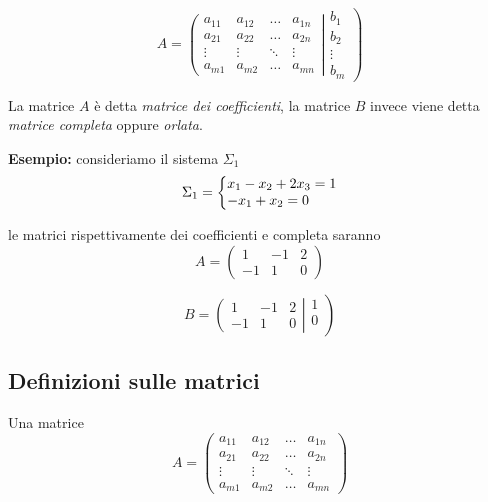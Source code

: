 \documentclass[a4paper]{article}
\makeatletter
\newenvironment{sistema}%
{\left\lbrace\begin{array}{{@{}l@{}l@{}l@{}l@{}}}}%
	{\end{array}\right.}
\newcommand{\n}{\par \noindent \newline}
\newcommand{\ns}{\par \noindent}
\makeatother
\begin{document}
\begin{equation*}
	A=
	\left(  
	\begin{array}{cccc}
		a_{11} & a_{12} & \dots&  a_{1n} \\
		a_{21} & a_{22} & \dots&  a_{2n} \\
		\vdots & \vdots & \ddots & \vdots \\
		a_{m1} & a_{m2} & \dots&  a_{mn}
	\end{array}\right |
	\left.
	\begin{array}{c}
		b_1 \\
		b_2 \\
		\vdots \\
		b_m
	\end{array}\right) 
\end{equation*}
\n
La matrice $A$ è detta \textit{matrice dei coefficienti}, la matrice $B$ invece viene detta \textit{matrice completa} oppure \textit{orlata}.
\n
\textbf{Esempio: }consideriamo il sistema $\Sigma_1$
\begin{equation*}
	\Sigma_1 = 
	\begin{sistema}
		x_1 - x_2 +2x_3 = 1 \\
		- x_1 + x_2 = 0
	\end{sistema}
\end{equation*}
\ns
le matrici rispettivamente dei coefficienti e completa saranno
\begin{equation*}
	A=
	\left(  
	\begin{array}{rrrr}
		1 & -1 & 2\\
		-1 & 1 & 0
	\end{array}\right) 
\end{equation*}

\begin{equation*}
	B=
	\left(  
	\begin{array}{rrrr}
		1 & -1 & 2\\
		-1 & 1 & 0
	\end{array}\right |
	\left.
	\begin{array}{r}
		1 \\
		0 \\
	\end{array}\right) 
\end{equation*}
\subsection{Definizioni sulle matrici}
Una matrice
\begin{equation*}
	A=
	\left(  
	\begin{array}{cccc}
		a_{11} & a_{12} & \dots&  a_{1n} \\
		a_{21} & a_{22} & \dots&  a_{2n} \\
		\vdots & \vdots & \ddots & \vdots \\
		a_{m1} & a_{m2} & \dots&  a_{mn}
		
	\end{array}\right)
\end{equation*}
\end{document}
